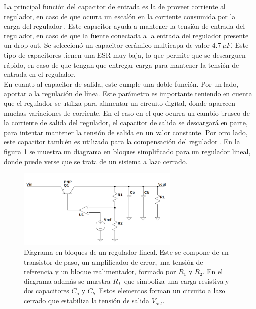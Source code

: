 La principal función del capacitor de entrada es la de proveer corriente al regulador, en caso de que ocurra un escalón en la corriente consumida por la carga del regulador \cite{TOSHIBALDO}. Este capacitor ayuda a mantener la tensión de entrada del regulador, en caso de que la fuente conectada a la entrada del regulador presente un drop-out. Se seleccionó un capacitor cerámico multicapa de valor $4.7 \ \mu F$. Este tipo de capacitores tienen una ESR muy baja, lo que permite que se descarguen rápido, en caso de que tengan que entregar carga para mantener la tensión de entrada en el regulador.\\

En cuanto al capacitor de salida, este cumple una doble función. Por un lado, aportar a la regulación de línea. Este parámetro es importante teniendo en cuenta que el regulador se utiliza para alimentar un circuito digital, donde aparecen muchas variaciones de corriente. En el caso en el que ocurra un cambio brusco de la corriente de salida del regulador, el capacitor de salida se descargará en parte, para intentar mantener la tensión de salida en un valor constante. Por otro lado, este capacitor también es utilizado para la compensación del regulador \cite{TOSHIBALDO}. En la figura \ref{fig:LDO_diagrama_bloques} se muestra un diagrama en bloques simplificado para un regulador lineal, donde puede verse que se trata de un sistema a lazo cerrado.

\begin{figure}[H]
    \centering
    \includegraphics[width=0.7\textwidth]{img/LDO_diagrama_bloques.png}
    \caption{Diagrama en bloques de un regulador lineal. Este se compone de un transistor de paso, un amplificador de error, una tensión de referencia y un bloque realimentador, formado por $R_1$ y $R_2$. En el diagrama además se muestra $R_L$ que simboliza una carga resistiva y dos capacitores $C_o$ y $C_b$. Estos elementos forman un circuito a lazo cerrado que estabiliza la tensión de salida $V_{out}$.}
    \label{fig:LDO_diagrama_bloques}    
\end{figure}


